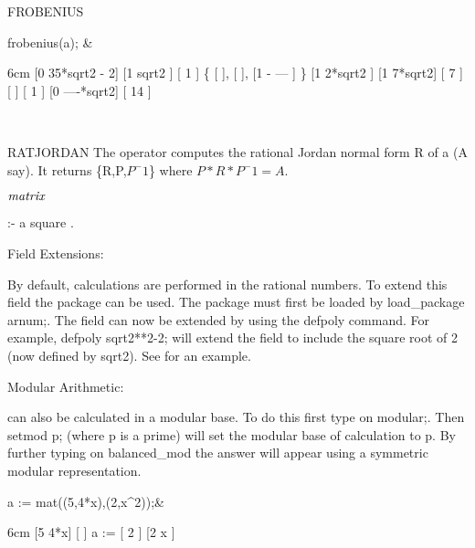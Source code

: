 \begin{Operator}[frobenius]{FROBENIUS}
\begin{Examples}
 frobenius(a); &
\begin{multilineoutput}{6cm}
  [0  35*sqrt2 - 2]    [1   sqrt2 ]    [           1  ]
\{ [               ],   [          ],   [1       - --- ]  \}
  [1    2*sqrt2   ]    [1  7*sqrt2]    [           7  ]
                                       [              ]
                                       [     1        ]
                                       [0   ----*sqrt2]
                                       [     14       ]

\end{multilineoutput}\\
\end{Examples}
\end{Operator}



\begin{Operator}[ratjordan]{RATJORDAN}
The operator  computes the rational Jordan normal form R
of a  (A say). It returns \{R,P,$P^-1$\} where $P*R*P^-1 = A$.

\begin{Syntax}
\(\meta{matrix}\)

 :- a square .
\end{Syntax}

Field Extensions:

By default, calculations are performed in the rational numbers. To 
extend this field the  package can be used. The package must
first be loaded by  load\_package arnum;. The field can now be extended
by using the defpoly command. For example, defpoly sqrt2**2-2; will
extend the field to include the square root of 2 (now defined by sqrt2).
See  for an example.

Modular Arithmetic:

 can also be calculated in a modular base. To do this 
first type on  modular;. Then setmod p; (where p is a prime) will set 
the modular base of calculation to p. By further typing on balanced\_mod
the answer will appear using a symmetric modular representation.

\begin{Examples}
 a := mat((5,4*x),(2,x^2));&
\begin{multilineoutput}{6cm}
     [5  4*x]
     [      ]
a := [    2 ]
     [2  x  ]
\end{multilineoutput}\\


\end{Examples}
\end{Operator}
